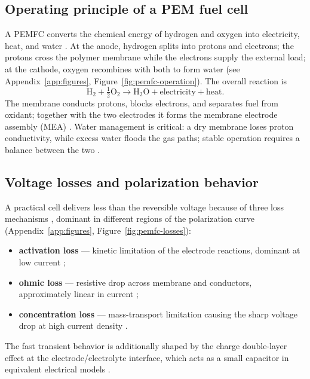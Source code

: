 \documentclass[11pt,a4paper]{article}
\begin{document}
\subsection{Operating principle of a PEM fuel cell}

A PEMFC converts the chemical energy of hydrogen and oxygen into electricity,
heat, and water \cite{manana2006,mohiuddin2018,thomya2011}. At the anode, hydrogen
splits into protons and electrons; the protons cross the polymer membrane while the
electrons supply the external load; at the cathode, oxygen recombines with both to
form water (see Appendix~\ref{app:figures}, Figure~\ref{fig:pemfc-operation}). The
overall reaction is
\begin{equation*}
    \mathrm{H_2 + \tfrac{1}{2}O_2 \rightarrow H_2O + electricity + heat}.
\end{equation*}
The membrane conducts protons, blocks electrons, and separates fuel from oxidant;
together with the two electrodes it forms the membrane electrode assembly (MEA)
\cite{manana2006,ionescu2020}. Water management is critical: a dry membrane loses
proton conductivity, while excess water floods the gas paths; stable operation
requires a balance between the two \cite{weber2004,zhang2017}.

\subsection{Voltage losses and polarization behavior}

A practical cell delivers less than the reversible voltage because of three loss
mechanisms \cite{manana2006,pukrushpan2003,thanapalan2008}, dominant in different
regions of the polarization curve (Appendix~\ref{app:figures},
Figure~\ref{fig:pemfc-losses}):
\begin{itemize}[itemsep=1pt]
    \item \textbf{activation loss} --- kinetic limitation of the electrode
          reactions, dominant at low current \cite{pukrushpan2003,weber2004};
    \item \textbf{ohmic loss} --- resistive drop across membrane and conductors,
          approximately linear in current \cite{pukrushpan2003,thanapalan2008};
    \item \textbf{concentration loss} --- mass-transport limitation causing the
          sharp voltage drop at high current density \cite{manana2006,weber2004}.
\end{itemize}
The fast transient behavior is additionally shaped by the charge double-layer
effect at the electrode/electrolyte interface, which acts as a small capacitor in
equivalent electrical models \cite{pukrushpan2003,manana2006}.
\end{document}
